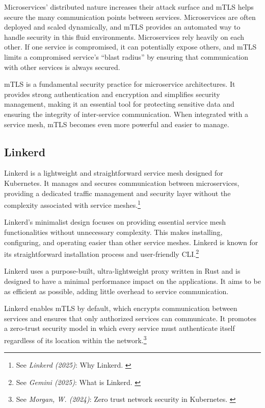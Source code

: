 Microservices' distributed nature increases their attack surface and
mTLS helps secure the many communication points between services.
Microservices are often deployed and scaled dynamically, and mTLS
provides an automated way to handle security in this fluid
environments. Microservices rely heavily on each other. If one service
is compromised, it can potentially expose others, and mTLS limits a
compromised service's ``blast radius'' by ensuring that communication
with other services is always secured.

mTLS is a fundamental security practice for microservice architectures.
It provides strong authentication and encryption and simplifies security
management, making it an essential tool for protecting sensitive data
and ensuring the integrity of inter-service communication. When
integrated with a service mesh, mTLS becomes even more powerful and
easier to manage.

\subsection{Linkerd}

Linkerd is a lightweight and straightforward service mesh designed for
Kubernetes. It manages and secures communication between microservices,
providing a dedicated traffic management and security layer without the
complexity associated with service meshes.\footnote{See \textit{Linkerd (2025)}: Why Linkerd. \cite{linkerD}}

Linkerd's minimalist design focuses on providing essential service
mesh functionalities without unnecessary complexity. This makes
installing, configuring, and operating easier than other service meshes.
Linkerd is known for its straightforward installation process and
user-friendly CLI.\footnote{See \textit{Gemini (2025)}: What is Linkerd. \cite{bardLinkerd}}

Linkerd uses a purpose-built, ultra-lightweight proxy written in Rust
and is designed to have a minimal performance impact on the
applications. It aims to be as efficient as possible, adding little
overhead to service communication.

Linkerd enables mTLS by default, which encrypts communication between
services and ensures that only authorized services can communicate. It
promotes a zero-trust security model in which every service must
authenticate itself regardless of its location within the network.\footnote{See \textit{Morgan, W. (2024)}: Zero trust network security in Kubernetes. \cite{zeroTrust}}

